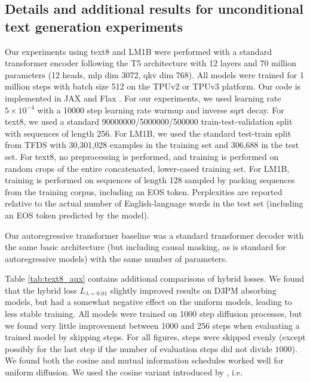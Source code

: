 

\subsection{Details and additional results for unconditional text generation experiments}

Our experiments using text8 and LM1B were performed with a standard transformer encoder following the T5 \citep{T5} architecture with 12 layers and 70 million parameters (12 heads, mlp dim 3072, qkv dim 768). All models were trained for 1 million steps with batch size 512 on the TPUv2 or TPUv3 platform. Our code is implemented in JAX \citep{jax2018github} and Flax \citep{flax2020github}. For our experiments, we used learning rate $5\times 10^{-4}$ with a 10000 step learning rate warmup and inverse sqrt decay. For text8, we used a standard 90000000/5000000/500000 train-test-validation split with sequences of length 256. For LM1B, we used the standard test-train split from TFDS with 30,301,028 examples in the training set and 306,688 in the test set. For text8, no preprocessing is performed, and training is performed on random crops of the entire concatenated, lower-cased training set. For LM1B, training is performed on sequences of length 128 sampled by packing sequences from the training corpus, including an EOS token. Perplexities are reported relative to the actual number of English-language words in the test set (including an EOS token predicted by the model). 

Our autoregressive transformer baseline was a standard transformer decoder with the same basic architecture (but including causal masking, as is standard for autoregressive models) with the same number of parameters.

Table \ref{tab:text8_aux} contains additional comparisons of hybrid losses. We found that the hybrid loss $L_{\lambda=0.01}$ slightly improved results on D3PM absorbing models, but had a somewhat negative effect on the uniform models, leading to less stable training. All models were trained on 1000 step diffusion processes, but we found very little improvement between 1000 and 256 steps when evaluating a trained model by skipping steps. For all figures, steps were skipped evenly (except possibly for the last step if the number of evaluation steps did not divide $1000$). We found both the cosine and mutual information schedules worked well for uniform diffusion. We used the cosine variant introduced by \citet{hoogeboom2021argmax}, i.e.

